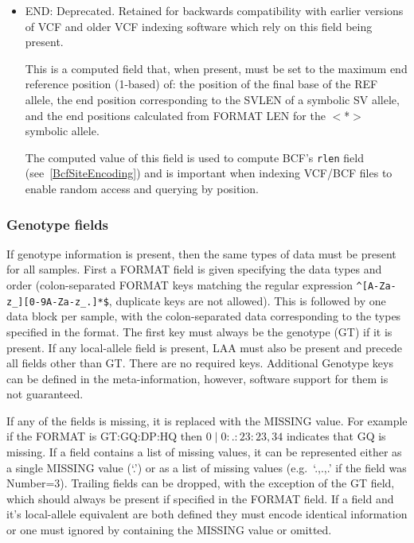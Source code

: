 \documentclass[8pt]{article}
\begin{document}
\begin{itemize}
\renewcommand{\labelitemii}{$\circ$}
\item END: Deprecated.
Retained for backwards compatibility with  earlier versions of VCF and older VCF indexing software which rely on this field being present.

This is a computed field that, when present, must be set to the maximum end reference position (1-based) of:
the position of the final base of the REF allele,
the end position corresponding to the SVLEN of a symbolic SV allele,
and the end positions calculated from FORMAT LEN for the $<$*$>$ symbolic allele.

The computed value of this field is used to compute BCF's {\tt rlen} field (see~\ref{BcfSiteEncoding}) and is important when indexing VCF/BCF files to enable random access and querying by position.

\end{itemize}

\subsubsection{Genotype fields}
If genotype information is present, then the same types of data must be present for all samples.
First a FORMAT field is given specifying the data types and order (colon-separated FORMAT keys matching the regular expression \texttt{\^{}[A-Za-z\_][0-9A-Za-z\_.]*\$}, duplicate keys are not allowed).
This is followed by one data block per sample, with the colon-separated data corresponding to the types specified in the format.
The first key must always be the genotype (GT) if it is present.
If any local-allele field is present, LAA must also be present and precede all fields other than GT.
There are no required keys.
Additional Genotype keys can be defined in the meta-information, however, software support for them is not guaranteed.

If any of the fields is missing, it is replaced with the MISSING value.
For example if the FORMAT is GT:GQ:DP:HQ then $0\mid0:.:23:23,34$ indicates that GQ is missing.
If a field contains a list of missing values, it can be represented either as a single MISSING value (`.') or as a list of missing values (e.g.\ `.,.,.' if the field was Number=3).
Trailing fields can be dropped, with the exception of the GT field, which should always be present if specified in the FORMAT field.
If a field and it's local-allele equivalent are both defined they must encode identical information or one must ignored by containing the MISSING value or omitted.
\end{document}
